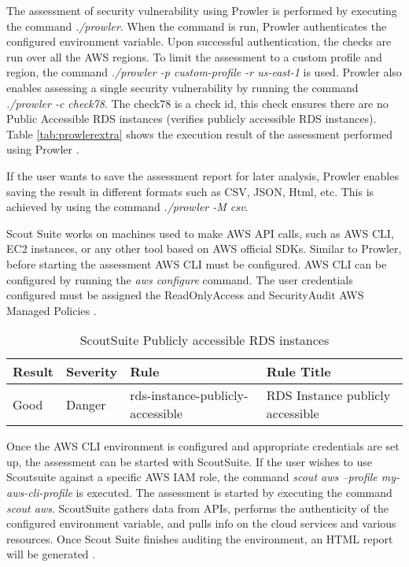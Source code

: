 \par The assessment of security vulnerability using Prowler is performed by executing the command \textit{./prowler}.
When the command is run, Prowler authenticates the configured environment variable.
Upon successful authentication, the checks are run over all the AWS regions.
To limit the assessment to a custom profile and region, the command \textit{./prowler -p custom-profile -r us-east-1} is used.
Prowler also enables assessing a single security vulnerability by running the command \textit{./prowler -c check78}.
The check78 is a check id, this check ensures there are no Public Accessible RDS instances (verifies publicly accessible RDS instances).
Table \ref{tab:prowlerextra} shows the execution result of the assessment performed using Prowler \cite{75}.

\par If the user wants to save the assessment report for later analysis, Prowler enables saving the result in different formats such as CSV, JSON, Html, etc.
This is achieved by using the command \textit{./prowler -M csv}\cite{75}.


\par Scout Suite works on machines used to make AWS API calls, such as AWS CLI, EC2 instances, or any other tool based on AWS official SDKs. Similar to Prowler, before starting the assessment AWS CLI must be configured.
AWS CLI can be configured by running the \textit{aws configure} command.
The user credentials configured must be assigned the ReadOnlyAccess and SecurityAudit AWS Managed Policies \cite{76}.

\begin{table}[h!]
    \begin{center}
        \caption{ScoutSuite Publicly accessible RDS instances}
        \label{tab:scoutsuiterule}
        \begin{tabular}{|p{1.4cm}|p{1.7cm}|p{5.0cm}|p{6.0cm}|}
            \hline
            \textbf{Result} & \textbf{Severity} & \textbf{Rule} & \textbf{Rule Title}\\
            \hline
            Good & Danger & rds-instance-publicly-accessible & RDS Instance publicly accessible \\
            \hline
        \end{tabular}
    \end{center}
\end{table}

Once the AWS CLI environment is configured and appropriate credentials are set up, the assessment can be started with ScoutSuite.
If the user wishes to use Scoutsuite against a specific AWS IAM role, the command \textit{scout aws --profile my-aws-cli-profile} is executed.
The assessment is started by executing the command \textit{scout aws}.
ScoutSuite gathers data from APIs, performs the authenticity of the configured environment variable, and pulls info on the cloud services and various resources.
Once Scout Suite finishes auditing the environment, an HTML report will be generated \cite{77}.

